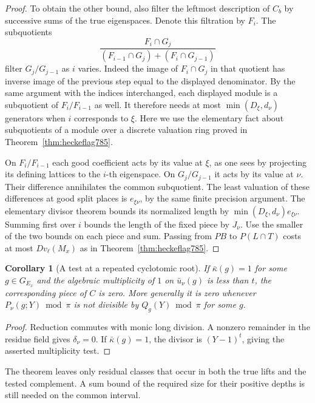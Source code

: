 \documentclass[a4paper,11pt]{article}
\newtheorem{corollary}[proposition]{Corollary}
\theoremstyle{definition}
\theoremstyle{remark}
\numberwithin{equation}{section}
\begin{document}
\begin{proof}
To obtain the other bound, also filter the leftmost
description of \(C_b\) by successive sums of the true
eigenspaces. Denote this filtration by \(F_i\).
The subquotients
\[
 \frac{F_i\cap G_j}
 {(F_{i-1}\cap G_j)+(F_i\cap G_{j-1})}
\]
filter \(G_j/G_{j-1}\) as \(i\) varies. Indeed the
image of \(F_i\cap G_j\) in that quotient has inverse
image of the previous step equal to the displayed
denominator. By the same argument with the indices
interchanged, each displayed module is a subquotient
of \(F_i/F_{i-1}\) as well. It therefore needs at most
\(\min(D_\xi,d_\nu)\) generators when \(i\) corresponds
to \(\xi\). Here we use the elementary fact about
subquotients of a module over a discrete valuation ring
proved in Theorem~\ref{thm:heckeflag785}.

On \(F_i/F_{i-1}\) each good coefficient acts by its
value at \(\xi\), as one sees by projecting its defining
lattices to the \(i\)-th eigenspace. On \(G_j/G_{j-1}\)
it acts by its value at \(\nu\). Their difference
annihilates the common subquotient. The least valuation
of these differences at good split places is
\(e_{\xi\nu}\), by the same finite precision argument.
The elementary divisor theorem bounds its normalized
length by \(\min(D_\xi,d_\nu)e_{\xi\nu}\).
Summing first over \(i\) bounds the length of the
fixed piece by \(J_\nu\). Use the smaller of the two
bounds on each piece and sum. Passing from \(PB\)
to \(P(L\cap T)\) costs at most \(D v_\ell(M_x)\)
as in Theorem~\ref{thm:heckeflag785}.
\end{proof}

\begin{corollary}[A test at a repeated cyclotomic root]
\leavevmode\label{cor:repeatedroot786}
If \(\bar\kappa(g)=1\) for some \(g\in G_{E_x}\)
and the algebraic multiplicity of \(1\) on
\(\bar u_\nu(g)\) is less than \(t\), the corresponding
piece of \(C\) is zero. More generally it is zero
whenever \(P_\nu(g;Y)\bmod\pi\) is not divisible by
\(Q_g(Y)\bmod\pi\) for some \(g\).
\end{corollary}
\begin{proof}
Reduction commutes with monic long division. A nonzero
remainder in the residue field gives \(\delta_\nu=0\).
If \(\bar\kappa(g)=1\), the divisor is \((Y-1)^t\),
giving the asserted multiplicity test.
\end{proof}
The theorem leaves only residual classes that occur in
both the true lifts and the tested complement. A sum
bound of the required size for their positive depths
is still needed on the common interval.
\clearpage
\end{document}
